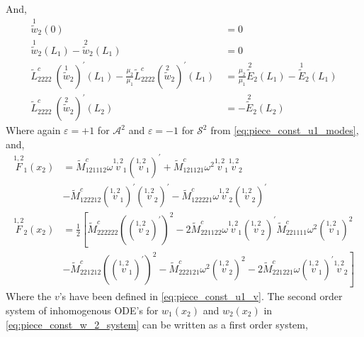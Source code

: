 \documentclass[11pt]{report}
\begin{document}
\begin{appendices}
\begin{equation}
\begin{aligned}
\end{aligned}
\end{equation}
And,
\begin{equation}
\begin{aligned}
\overset{1}{\widetilde{w}}_2(0) &=  0 \\
\overset{1}{\widetilde{w}}_2(L_1) - \overset{2}{\widetilde{w}}_2(L_1) &= 0 \\
\tilde{L}^{c}_{2222} \: \left( \overset{1}{\widetilde{w}}_2 \right)^\prime(L_1) - \frac{\mu_2}{\mu_1} \tilde{L}^{c}_{2222} \left( \overset{2}{\widetilde{w}}_2 \right)^\prime (L_1) \: &=  \frac{\mu_2}{\mu_1} \overset{2}{\widetilde{E}}_2(L_1) - \overset{1}{\widetilde{E}}_2(L_1)  \\
\tilde{L}^{c}_{2222} \: \left( \overset{2}{\widetilde{w}}_2 \right)^\prime(L_2) &= - \overset{2}{\widetilde{E}}_2(L_2)
\end{aligned}
\end{equation}
Where again $\varepsilon = +1$ for $\mathcal{A}^2$ and $\varepsilon = -1$ for $\mathcal{S}^2$ from \eqref{eq:piece_const_u1_modes}, and,
\begin{equation}
\begin{aligned}
\overset{1,2}{F}_1(x_2) &= \tilde{M}^c_{121112} \omega \overset{1,2}{v}_1 \left( \overset{1,2}{v}_1 \right)^\prime +  \tilde{M}^c_{121121} \omega^2 \overset{1,2}{v}_1 \overset{1,2}{v}_2 \\
&- \tilde{M}^c_{122212} \left( \overset{1,2}{v}_1 \right)^\prime \left( \overset{1,2}{v}_2 \right)^\prime - \tilde{M}^c_{122221} \omega \overset{1,2}{v}_2 \left(\overset{1,2}{v}_2 \right)^\prime \\
\overset{1,2}{F}_2(x_2) &= \frac{1}{2} \left[ \tilde{M}^c_{222222} \left( \left( \overset{1,2}{v}_2 \right)^\prime \right)^2 - 2 \tilde{M}^c_{221122} \omega \overset{1,2}{v}_1 \left( \overset{1,2}{v}_2 \right)^\prime \tilde{M}^c_{221111} \omega^2 \left( \overset{1,2}{v}_1 \right)^2 \right. \\
&- \left. \tilde{M}^c_{221212} \left( \left( \overset{1,2}{v}_1 \right)^\prime \right)^2 - \tilde{M}^c_{222121} \omega^2 \left( \overset{1,2}{v}_2 \right)^2 - 2 \tilde{M}^c_{221221} \omega \left( \overset{1,2}{v}_1 \right)^\prime \overset{1,2}{v}_2 \right]
\end{aligned}
\end{equation}
Where the $v$'s have been defined in \eqref{eq:piece_const_u1_v}. The second order system of inhomogenous ODE's for $w_1(x_2)$ and $w_2(x_2)$ in \eqref{eq:piece_const_w_2_system} can be written as a first order system,

\end{appendices}
\end{document}
